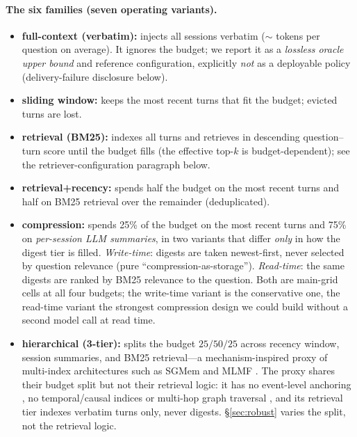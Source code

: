\documentclass{article} %
\begin{document}
\paragraph{The six families (seven operating variants).}
\begin{itemize}\setlength{\itemsep}{1pt}
    \item \textbf{full-context (verbatim):} injects all sessions verbatim
    ($\sim$\fcFoot{} tokens per question on average). It ignores the budget; we report it
    as a \emph{lossless oracle upper bound} and reference configuration, explicitly
    \emph{not} as a deployable policy (delivery-failure disclosure below).
    \item \textbf{sliding window:} keeps the most recent turns that fit the budget;
    evicted turns are lost.
    \item \textbf{retrieval (BM25):} indexes all turns and retrieves in descending
    question--turn score until the budget fills (the effective top-$k$ is
    budget-dependent); see the retriever-configuration paragraph below.
    \item \textbf{retrieval+recency:} spends half the budget on the most recent turns and
    half on BM25 retrieval over the remainder (deduplicated).
    \item \textbf{compression:} spends 25\% of the budget on the most recent turns and 75\%
    on \emph{per-session LLM summaries}, in two variants that differ \emph{only} in how the
    digest tier is filled. \emph{Write-time}: digests are taken newest-first, never selected by
    question relevance (pure ``compression-as-storage''). \emph{Read-time}: the same digests
    are ranked by BM25 relevance to the question. Both are main-grid cells at all four budgets;
    the write-time variant is the conservative one, the read-time variant the strongest
    compression design we could build without a second model call at read time.
    \item \textbf{hierarchical (3-tier):} splits the budget $25/50/25$ across recency
    window, session summaries, and BM25 retrieval---a mechanism-inspired proxy of
    multi-index architectures such as SGMem \citep{wu2025sgmem} and MLMF
    \citep{mlmf2026}. The proxy shares their budget split but not their retrieval logic:
    it has no event-level anchoring \citep{cao2026higmem}, no temporal/causal indices or
    multi-hop graph traversal \citep{jiang2026magma}, and its retrieval tier indexes
    verbatim turns only, never digests. \S\ref{sec:robust} varies the split, not the
    retrieval logic.
\end{itemize}
\end{document}
